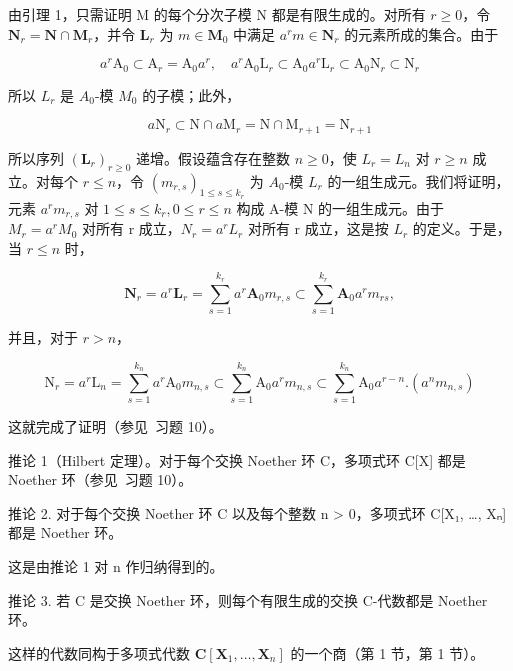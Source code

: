 	由引理 1，只需证明 M 的每个分次子模 N 都是有限生成的。对所有 \(r \geqslant 0\)，令 \(\mathbf{N}_r = \mathbf{N} \cap \mathbf{M}_r\)，并令 \(\mathbf{L}_r\) 为 \(m \in \mathbf{M}_0\) 中满足 \(a^r m \in \mathbf{N}_r\) 的元素所成的集合。由于

\[
a ^ {r} \mathrm{A} _ {0} \subset \mathrm{A} _ {r} = \mathrm{A} _ {0} a ^ {r}, \quad a ^ {r} \mathrm{A} _ {0} \mathrm{L} _ {r} \subset \mathrm{A} _ {0} a ^ {r} \mathrm{L} _ {r} \subset \mathrm{A} _ {0} \mathrm{N} _ {r} \subset \mathrm{N} _ {r}
\]

	所以 \(L_{r}\) 是 \(A_{0}\)-模 \(M_{0}\) 的子模；此外，

\[
a \mathrm{N} _ {r} \subset \mathrm{N} \cap a \mathrm{M} _ {r} = \mathrm{N} \cap \mathrm{M} _ {r + 1} = \mathrm{N} _ {r + 1}
\]

	所以序列 \((\mathbf{L}_{r})_{r\geqslant0}\) 递增。假设蕴含存在整数 \(n\geqslant0\)，使 \(L_{r}=L_{n}\) 对 \(r\geqslant n\) 成立。对每个 \(r\leqslant n\)，令 \((m_{r,s})_{1\leqslant s\leqslant k_{r}}\) 为 \(A_{0}\)-模 \(L_{r}\) 的一组生成元。我们将证明，元素 \(a^{r}m_{r,s}\) 对 \(1\leqslant s\leqslant k_{r}, 0\leqslant r\leqslant n\) 构成 A-模 N 的一组生成元。由于 \(M_{r}=a^{r}M_{0}\) 对所有 r 成立，\(N_{r}=a^{r}L_{r}\) 对所有 r 成立，这是按 \(L_{r}\) 的定义。于是，当 \(r\leqslant n\) 时，

\[
\mathbf {N} _ {r} = a ^ {r} \mathbf {L} _ {r} = \sum_ {s = 1} ^ {k _ {r}} a ^ {r} \mathbf {A} _ {0} m _ {r, s} \subset \sum_ {s = 1} ^ {k _ {r}} \mathbf {A} _ {0} a ^ {r} m _ {r s},
\]

并且，对于 \(r > n\)，

\[
\mathrm{N} _ {r} = a ^ {r} \mathrm{L} _ {n} = \sum_ {s = 1} ^ {k _ {n}} a ^ {r} \mathrm{A} _ {0} m _ {n, s} \subset \sum_ {s = 1} ^ {k _ {n}} \mathrm{A} _ {0} a ^ {r} m _ {n, s} \subset \sum_ {s = 1} ^ {k _ {n}} \mathrm{A} _ {0} a ^ {r - n}. (a ^ {n} m _ {n, s})
\]

	这就完成了证明（参见~习题 10）。

	推论 1（Hilbert 定理）。对于每个交换 Noether 环 C，多项式环 C{[}X{]} 都是 Noether 环（参见~习题 10）。

	推论 2. 对于每个交换 Noether 环 C 以及每个整数 n \textgreater{} 0，多项式环 C{[}X₁, \ldots, Xₙ{]} 都是 Noether 环。

	这是由推论 1 对 n 作归纳得到的。

	推论 3. 若 C 是交换 Noether 环，则每个有限生成的交换 C-代数都是 Noether 环。

	这样的代数同构于多项式代数 \(\mathbf{C}[\mathbf{X}_1,\ldots ,\mathbf{X}_n]\) 的一个商（第 1 节，第 1 节）。

